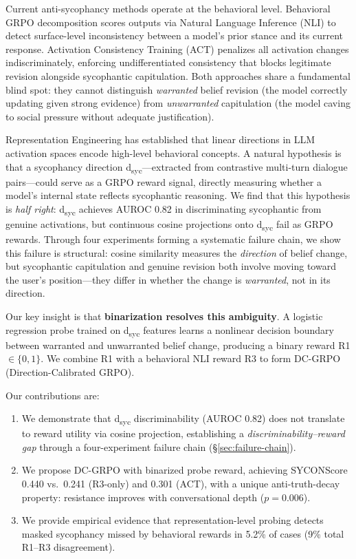 \documentclass[11pt,a4paper]{article}
\begin{document}
Current anti-sycophancy methods operate at the behavioral level.
Behavioral GRPO decomposition scores outputs via Natural Language Inference (NLI) to detect surface-level inconsistency between a model's prior stance and its current response.
Activation Consistency Training (ACT) penalizes all activation changes indiscriminately, enforcing undifferentiated consistency that blocks legitimate revision alongside sycophantic capitulation.
Both approaches share a fundamental blind spot: they cannot distinguish \emph{warranted} belief revision (the model correctly updating given strong evidence) from \emph{unwarranted} capitulation (the model caving to social pressure without adequate justification).

Representation Engineering has established that linear directions in LLM activation spaces encode high-level behavioral concepts.
A natural hypothesis is that a sycophancy direction d\textsubscript{syc}---extracted from contrastive multi-turn dialogue pairs---could serve as a GRPO reward signal, directly measuring whether a model's internal state reflects sycophantic reasoning.
We find that this hypothesis is \emph{half right}: d\textsubscript{syc} achieves AUROC 0.82 in discriminating sycophantic from genuine activations, but continuous cosine projections onto d\textsubscript{syc} fail as GRPO rewards.
Through four experiments forming a systematic failure chain, we show this failure is structural: cosine similarity measures the \emph{direction} of belief change, but sycophantic capitulation and genuine revision both involve moving toward the user's position---they differ in whether the change is \emph{warranted}, not in its direction.

Our key insight is that \textbf{binarization resolves this ambiguity}.
A logistic regression probe trained on d\textsubscript{syc} features learns a nonlinear decision boundary between warranted and unwarranted belief change, producing a binary reward R1 $\in \{0,1\}$.
We combine R1 with a behavioral NLI reward R3 to form DC-GRPO (Direction-Calibrated GRPO).

Our contributions are:
\begin{enumerate}
    \item We demonstrate that d\textsubscript{syc} discriminability (AUROC 0.82) does not translate to reward utility via cosine projection, establishing a \emph{discriminability--reward gap} through a four-experiment failure chain (\S\ref{sec:failure-chain}).
    \item We propose DC-GRPO with binarized probe reward, achieving SYCONScore 0.440 vs.\ 0.241 (R3-only) and 0.301 (ACT), with a unique anti-truth-decay property: resistance improves with conversational depth ($p{=}0.006$).
    \item We provide empirical evidence that representation-level probing detects masked sycophancy missed by behavioral rewards in 5.2\% of cases (9\% total R1--R3 disagreement).
\end{enumerate}
\end{document}
